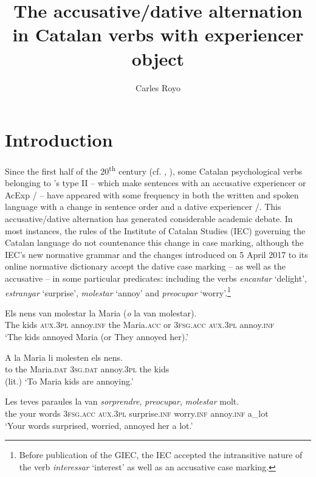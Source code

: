 \documentclass[output=paper,colorlinks,citecolor=brown,modfonts,nonflat]{langsci/langscibook}
\author{Carles Royo\affiliation{Universitat Rovira i Virgili}}
\title{The accusative/dative alternation in Catalan verbs with experiencer object}
\begin{document}
\maketitle
\nocite{DIEC2007}


\section{Introduction}\label{sec:royo:1}

Since the first half of the 20\textsuperscript{th} century (cf. \citealt[16]{Ginebra2003}, \citealt[147]{Ginebra2015}), some Catalan psychological verbs belonging to \citet{BellettiRizzi1988}'s type II – which make sentences with an accusative experiencer or AcExp / – have appeared with some frequency in both the written and spoken language with a change in sentence order and a dative experiencer /. This accusative/dative alternation has generated considerable academic debate. In most instances, the rules of the Institute of Catalan Studies (IEC) governing the Catalan language do not countenance this change in case marking, although the IEC’s new normative grammar \citep{GIEC2016} and the changes introduced on 5 April 2017 to its online normative dictionary \citep{DIEC2007} accept the dative case marking – as well as the accusative – in some particular predicates: including the verbs \textit{encantar} ‘delight’, \textit{estranyar} ‘surprise’, \textit{molestar} ‘annoy’ and \textit{preocupar} ‘worry’.\footnote{Before publication of the GIEC, the IEC accepted the intransitive nature of the verb \textit{interessar} ‘interest’ as well as an accusative case marking.}

\ea%
 \label{ex:royo:1}
 \ea \label{ex:royo:1a}
 \gll Els nens van molestar la Maria (\emph{o} la van molestar).\\
The kids  \textsc{aux.3pl} annoy.\textsc{inf} the Maria.\textsc{acc} or 3\textsc{fsg.acc} \textsc{aux.3pl} annoy.\textsc{inf}\\
 \glt ‘The kids annoyed Maria (or They annoyed her).’

 \ex \label{ex:royo:1b}
 \gll A la Maria li molesten els nens.\\
 to the Maria.\textsc{dat} \textsc{3sg.dat} annoy.\textsc{3pl} the kids\\
 \glt  (lit.) ‘To Maria kids are annoying.’
 \z
 \z

\ea%
 \label{ex:royo:2} \citealt[77]{CabréMateu1998}
 \ea \label{ex:royo:2a}
 \gll Les teves paraules la van \emph{sorprendre}, \emph{preocupar}, \emph{molestar} molt.\\
the  your words     \textsc{3fsg.acc} \textsc{aux.3pl} surprise.\textsc{inf} worry.\textsc{inf}  annoy.\textsc{inf} a\_lot\\
 \glt ‘Your words surprised, worried, annoyed her a lot.’
\end{document}
